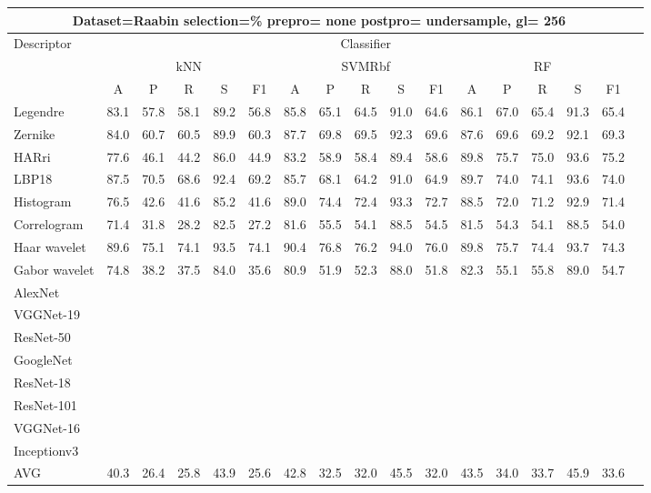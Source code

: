 \documentclass[12pt,italian]{article}
\begin{document}
\begin{tiny}
\begin{longtable}{lcccccccccccccccc}
\toprule
\multicolumn{16}{c}{Dataset=Raabin selection=\% prepro= none postpro= undersample, gl= 256} \\ 
\toprule
Descriptor & \multicolumn{15}{c}{Classifier} \\ 
& \multicolumn{5}{c}{kNN} & \multicolumn{5}{c}{SVMRbf} & \multicolumn{5}{c}{RF} \\ 
& A & P & R & S & F1 & A & P & R & S & F1 & A & P & R & S & F1 \\ 
\midrule
Legendre & 83.1 & 57.8 & 58.1 & 89.2 & 56.8 & 85.8 & 65.1 & 64.5 & 91.0 & 64.6 & 86.1 & 67.0 & 65.4 & 91.3 & 65.4 \\ 
Zernike & 84.0 & 60.7 & 60.5 & 89.9 & 60.3 & 87.7 & 69.8 & 69.5 & 92.3 & 69.6 & 87.6 & 69.6 & 69.2 & 92.1 & 69.3 \\ 
HARri & 77.6 & 46.1 & 44.2 & 86.0 & 44.9 & 83.2 & 58.9 & 58.4 & 89.4 & 58.6 & 89.8 & 75.7 & 75.0 & 93.6 & 75.2 \\ 
LBP18 & 87.5 & 70.5 & 68.6 & 92.4 & 69.2 & 85.7 & 68.1 & 64.2 & 91.0 & 64.9 & 89.7 & 74.0 & 74.1 & 93.6 & 74.0 \\ 
Histogram & 76.5 & 42.6 & 41.6 & 85.2 & 41.6 & 89.0 & 74.4 & 72.4 & 93.3 & 72.7 & 88.5 & 72.0 & 71.2 & 92.9 & 71.4 \\ 
Correlogram & 71.4 & 31.8 & 28.2 & 82.5 & 27.2 & 81.6 & 55.5 & 54.1 & 88.5 & 54.5 & 81.5 & 54.3 & 54.1 & 88.5 & 54.0 \\ 
Haar wavelet & 89.6 & 75.1 & 74.1 & 93.5 & 74.1 & 90.4 & 76.8 & 76.2 & 94.0 & 76.0 & 89.8 & 75.7 & 74.4 & 93.7 & 74.3 \\ 
Gabor wavelet & 74.8 & 38.2 & 37.5 & 84.0 & 35.6 & 80.9 & 51.9 & 52.3 & 88.0 & 51.8 & 82.3 & 55.1 & 55.8 & 89.0 & 54.7 \\ 
AlexNet \\ 
VGGNet-19 \\ 
ResNet-50 \\ 
GoogleNet \\ 
ResNet-18 \\ 
ResNet-101 \\ 
VGGNet-16 \\ 
Inceptionv3 \\ 
\hline
AVG & 40.3 & 26.4 & 25.8 & 43.9 & 25.6 & 42.8 & 32.5 & 32.0 & 45.5 & 32.0 & 43.5 & 34.0 & 33.7 & 45.9 & 33.6 \\ 
\hline
\bottomrule
\end{longtable} 


\end{tiny}
\end{document}
